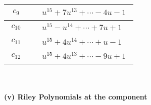 \documentclass[1p]{elsarticle_modified}
\theoremstyle{definition}
\begin{document}
\begin{tabular}{m{50pt}|m{274pt}}
\hline $$\begin{aligned}c_{9}\end{aligned}$$&$\begin{aligned}
&u^{15}+7 u^{13}+\cdots-4 u-1
\end{aligned}$\\
\hline $$\begin{aligned}c_{10}\end{aligned}$$&$\begin{aligned}
&u^{15}- u^{14}+\cdots+7 u+1
\end{aligned}$\\
\hline $$\begin{aligned}c_{11}\end{aligned}$$&$\begin{aligned}
&u^{15}+4 u^{14}+\cdots+u-1
\end{aligned}$\\
\hline $$\begin{aligned}c_{12}\end{aligned}$$&$\begin{aligned}
&u^{15}+4 u^{13}+\cdots-9 u+1
\end{aligned}$\\
\hline
\end{tabular}\\~\\
\newpage\renewcommand{\arraystretch}{1}
\flushleft \textbf{(v) Riley Polynomials at the component}\newline \\
\end{document}
